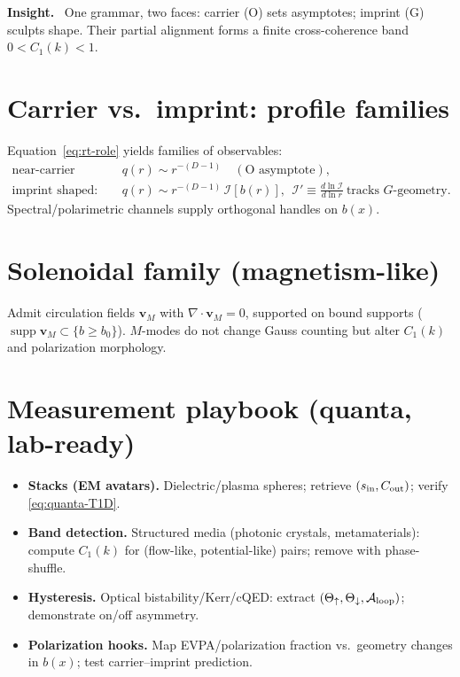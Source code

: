 \documentclass[12pt,a4paper,oneside]{scrreprt}
\newenvironment{insight}{\par\vspace{0.5em}\noindent\textbf{Insight.}\ }{\par\vspace{0.5em}}
\begin{document}
\begin{insight}
One grammar, two faces: carrier (O) sets asymptotes; imprint (G) sculpts shape. Their partial alignment forms a finite cross-coherence band $0<C_1(k)<1$.
\end{insight}

\section{Carrier vs.\ imprint: profile families}\label{sec:carrier-imprint}
Equation~\eqref{eq:rt-role} yields families of observables:
\begin{align}
\text{near-carrier dominated: } & q(r)\sim r^{-(D-1)} \quad (\text{O asymptote}),\\
\text{imprint shaped: } & q(r)\sim r^{-(D-1)}\,\mathcal I[b(r)],\ \ 
\mathcal I' \equiv \frac{d\ln \mathcal I}{d\ln r} \ \text{tracks $G$-geometry}.
\end{align}
Spectral/polarimetric channels supply orthogonal handles on $b(x)$.

\section{Solenoidal family (magnetism-like)}\label{sec:solenoids}
Admit circulation fields $\mathbf v_M$ with $\nabla\!\cdot\mathbf v_M=0$, supported on bound supports ($\operatorname{supp}\mathbf v_M\subset\{b\ge b_0\}$). $M$-modes do not change Gauss counting but alter $C_1(k)$ and polarization morphology.

\section{Measurement playbook (quanta, lab-ready)}\label{sec:quanta-playbook}
\begin{itemize}
\item \textbf{Stacks (EM avatars).} Dielectric/plasma spheres; retrieve $(s_{\rm in},C_{\rm out})$; verify \eqref{eq:quanta-T1D}.
\item \textbf{Band detection.} Structured media (photonic crystals, metamaterials): compute $C_1(k)$ for (flow-like, potential-like) pairs; remove with phase-shuffle.
\item \textbf{Hysteresis.} Optical bistability/Kerr/cQED: extract $(\Theta_\uparrow,\Theta_\downarrow,\mathcal A_{\rm loop})$; demonstrate on/off asymmetry.
\item \textbf{Polarization hooks.} Map EVPA/polarization fraction vs.\ geometry changes in $b(x)$; test carrier–imprint prediction.
\end{itemize}
\end{document}
